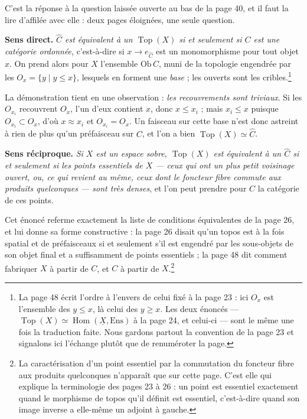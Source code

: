 \documentclass[11pt,a4paper]{article}
\begin{document}
C'est la réponse à la question laissée ouverte au bas de la page 40, et il
faut la lire d'affilée avec elle : deux pages éloignées, une seule question.

\textbf{Sens direct.} \emph{$\widehat{C}$ est équivalent à un
$\operatorname{Top}(X)$ si et seulement si $C$ est une catégorie ordonnée},
c'est-à-dire si $x \to e_{\widehat{C}}$ est un monomorphisme pour tout objet
$x$. On prend alors pour $X$ l'ensemble $\mathrm{Ob}\,C$, muni de la topologie
engendrée par les $O_{x} = \{ y \mid y \leq x \}$, lesquels en forment une
\emph{base} ; les ouverts sont les cribles.\footnote{La page 48 écrit l'ordre à
l'envers de celui fixé à la page 23 : ici $O_{x}$ est l'ensemble des
$y \leq x$, là celui des $y \geq x$. Les deux énoncés — $\operatorname{Top}(X)
\simeq \operatorname{Hom}(\underline{X}, \mathrm{Ens})$ à la page 24, et celui-ci —
sont le même une fois la traduction faite. Nous gardons partout la convention
de la page 23 et signalons ici l'échange plutôt que de renuméroter la page.}

La démonstration tient en une observation : \emph{les recouvrements sont
triviaux}. Si les $O_{x_{i}}$ recouvrent $O_{x}$, l'un d'eux contient $x$,
donc $x \leq x_{i}$ ; mais $x_{i} \leq x$ puisque $O_{x_{i}} \subset O_{x}$,
d'où $x \approx x_{i}$ et $O_{x_{i}} = O_{x}$. Un faisceau sur cette base n'est
donc astreint à rien de plus qu'un préfaisceau sur $C$, et l'on a bien
$\operatorname{Top}(X) \simeq \widehat{C}$.

\textbf{Sens réciproque.} \emph{Si $X$ est un espace sobre,
$\operatorname{Top}(X)$ est équivalent à un $\widehat{C}$ si et seulement si
les points essentiels de $X$ — ceux qui ont un plus petit voisinage ouvert, ou,
ce qui revient au même, ceux dont le foncteur fibre commute aux produits
quelconques — sont très denses}, et l'on peut prendre pour $C$ la catégorie de
ces points.

Cet énoncé referme exactement la liste de conditions équivalentes de la
page 26, et lui donne sa forme constructive : la page 26 disait qu'un topos est
à la fois spatial et de préfaisceaux si et seulement s'il est engendré par les
sous-objets de son objet final et a suffisamment de points essentiels ; la
page 48 dit comment fabriquer $X$ à partir de $C$, et $C$ à partir de
$X$.\footnote{La caractérisation d'un point essentiel par la commutation du
foncteur fibre aux produits quelconques n'apparaît que sur cette page. C'est
elle qui explique la terminologie des pages 23 à 26 : un point est essentiel exactement
quand le morphisme de topos qu'il définit est essentiel, c'est-à-dire quand son
image inverse a elle-même un adjoint à gauche.}
\end{document}
